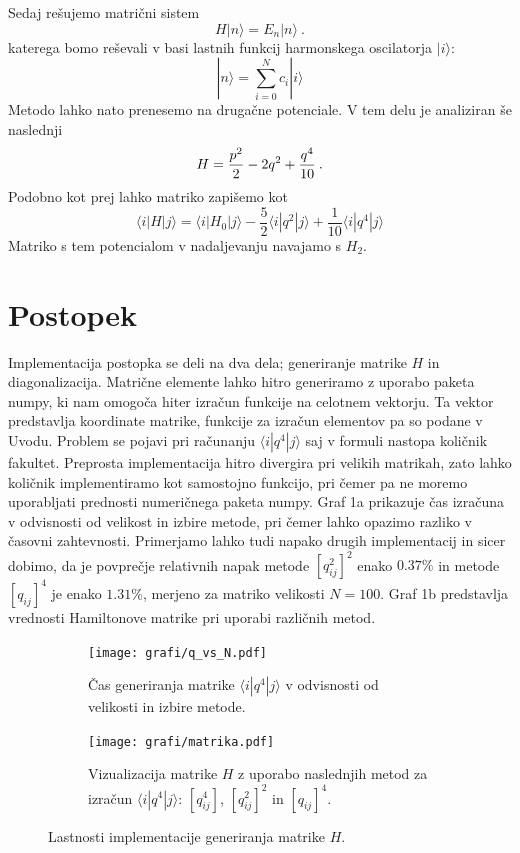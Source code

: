 \documentclass[12pt, a4paper]{article}
\begin{document}
Sedaj rešujemo matrični sistem
\begin{equation*}
  H | n \rangle = E_n | n \rangle \>.
\end{equation*}
katerega bomo reševali v basi lastnih funkcij harmonskega oscilatorja $| i \rangle$:
\begin{equation*}
  | n \rangle = \sum_{i=0}^N c_i | i \rangle
\end{equation*}
Metodo lahko nato prenesemo na drugačne potenciale. V tem delu je analiziran še naslednji
\begin{equation*}
  H = {p^2\over 2} - 2q^2 + {q^4\over 10} \>.
\end{equation*}
Podobno kot prej lahko matriko zapišemo kot
\begin{equation*}
  \langle  i | H | j \rangle = \langle  i | H_0 | j \rangle - \frac{5}{2} \langle  i | q^2 | j \rangle + \frac{1}{10} \langle  i | q^4 | j \rangle
\end{equation*}
Matriko s tem potencialom v nadaljevanju navajamo s $H_2$.


\section{Postopek}
Implementacija postopka se deli na dva dela; generiranje matrike $H$ in diagonalizacija. Matrične elemente lahko hitro generiramo z uporabo paketa {\sc numpy}, ki nam omogoča hiter izračun funkcije na celotnem vektorju. Ta vektor predstavlja koordinate matrike, funkcije za izračun elementov pa so podane v Uvodu. Problem se pojavi pri računanju $\langle  i | q^4 | j \rangle$ saj v formuli nastopa količnik fakultet. Preprosta implementacija hitro divergira pri velikih matrikah, zato lahko količnik implementiramo kot samostojno funkcijo, pri čemer pa ne moremo uporabljati prednosti numeričnega paketa {\sc numpy}. Graf 1a prikazuje čas izračuna v odvisnosti od velikost in izbire metode, pri čemer lahko opazimo razliko v časovni zahtevnosti. Primerjamo lahko tudi napako drugih implementacij in sicer dobimo, da je povprečje relativnih napak metode $[q_{ij}^2]^2$ enako $0.37\%$ in metode $[q_{ij}]^4$ je enako $1.31\%$, merjeno za matriko velikosti $N=100$. Graf 1b predstavlja vrednosti Hamiltonove matrike pri uporabi različnih metod.\\
\begin{figure}[hbtp]
  \centering
  \begin{subfigure}{\textwidth}
    \centering 
    \texttt{[image: grafi/q\_vs\_N.pdf]}
    \caption{Čas generiranja matrike $\langle  i | q^4 | j \rangle$ v odvisnosti od velikosti in izbire metode.}
    \label{fig:sub1}
  \end{subfigure} 
  \begin{subfigure}{\textwidth}
    \centering
    \texttt{[image: grafi/matrika.pdf]}
    \caption{Vizualizacija matrike $H$ z uporabo naslednjih metod za izračun $\langle  i | q^4 | j \rangle$: $[q_{ij}^4]$, $[q_{ij}^2]^2$ in $[q_{ij}]^4$.}
    \label{fig:sub2}
  \end{subfigure}   
  \caption{Lastnosti implementacije generiranja matrike $H$.}
  \label{fig:test}
\end{figure}
\end{document}
